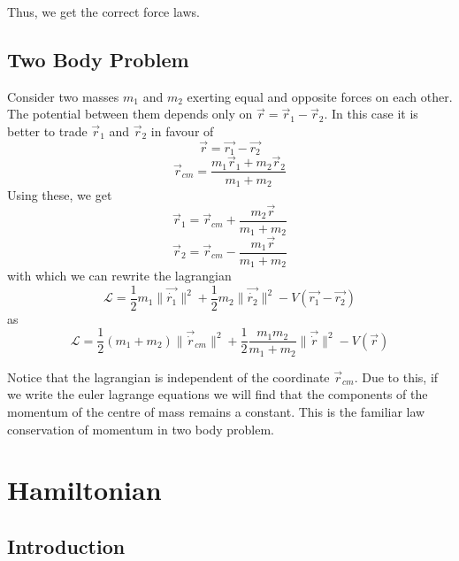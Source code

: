 \documentclass[12pt,a4paper]{report}
\newcommand{\lagrangian}{\mathcal{L}}
\begin{document}
Thus, we get the correct force laws.

\subsection{Two Body Problem}

Consider two masses $m_1$ and $m_2$ exerting equal and opposite forces on each other. The potential between them depends only on $\vec{r} = \vec{r}_1 - \vec{r}_2$. In this case it is better to trade $\vec{r}_1$ and $\vec{r}_2$ in favour of
\begin{equation*}
    \vec{r} = \vec{r_1} - \vec{r_2}
\end{equation*}
\begin{equation*}
    \vec{r}_{cm} = \frac{m_1\vec{r}_1 + m_2\vec{r}_2}{m_1+m_2}
\end{equation*}
Using these, we get
\begin{equation*}
    \vec{r}_1 = \vec{r}_{cm} + \frac{m_2\vec{r}}{m_1+m_2}
\end{equation*}
\begin{equation*}
    \vec{r}_2 = \vec{r}_{cm} - \frac{m_1\vec{r}}{m_1+m_2}
\end{equation*}
with which we can rewrite the lagrangian
\begin{equation*}
    \lagrangian = \frac{1}{2}m_1\| \vec{\dot{r_1}} \|^2 + \frac{1}{2}m_2\| \vec{\dot{r_2}} \|^2 - V(\vec{r_1} - \vec{r_2})
\end{equation*}
as
\begin{equation*}
    \lagrangian = \frac{1}{2}(m_1+m_2)\| \vec{\dot{r}}_{cm} \|^2 + \frac{1}{2}\frac{m_1m_2}{m_1+m_2}\| \vec{\dot{r}} \|^2 - V(\vec{r})
\end{equation*}

Notice that the lagrangian is independent of the coordinate $\vec{r}_{cm}$. Due to this, if we write the euler lagrange equations we will find that the components of the momentum of the centre of mass remains a constant. This is the familiar law conservation of momentum in two body problem.

\section{Hamiltonian}

\subsection{Introduction}
\end{document}
